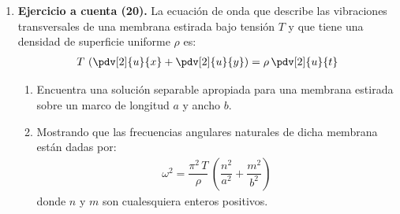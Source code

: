 \begin{enumerate}[label=\roman*)]
\item \textbf{Ejercicio a cuenta (20). } La ecuación de onda que describe las vibraciones transversales de una membrana estirada bajo tensión $T$ y que tiene una densidad de superficie uniforme $\rho$ es:
\begin{align*}
T \, \left( \pdv[2]{u}{x} + \pdv[2]{u}{y} \right) = \rho \, \pdv[2]{u}{t}
\end{align*}
\begin{enumerate}[label=\alph*)]
\item Encuentra una solución separable apropiada para una membrana estirada sobre un marco de longitud $a$ y ancho $b$.
\item Mostrando que las frecuencias angulares naturales de dicha membrana están dadas por:
\begin{align*}
    \omega^{2} = \dfrac{\pi^{2} \, T}{\rho} \, \left( \dfrac{n^{2}}{a^{2}} + \dfrac{m^{2}}{b^{2}} \right)
\end{align*}
donde $n$ y $m$ son cualesquiera enteros positivos.
\end{enumerate}
\end{enumerate}
